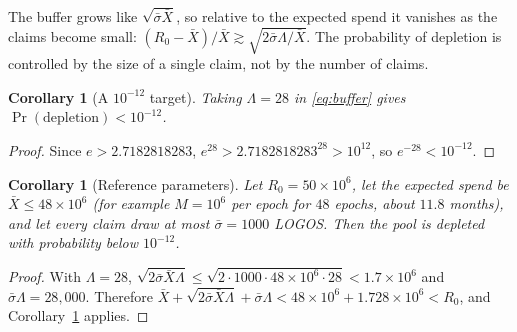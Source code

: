 \documentclass[11pt,a4paper]{article}
\newtheorem{corollary}[theorem]{Corollary}
\begin{document}
The buffer grows like $\sqrt{\bar\sigma\bar X}$, so relative to the expected spend it vanishes as the claims become small: $(R_0-\bar X)/\bar X\gtrsim\sqrt{2\bar\sigma\Lambda/\bar X}$. The probability of depletion is controlled by the size of a single claim, not by the number of claims.

\begin{corollary}[A $10^{-12}$ target]\label{cor:1e-12}
Taking $\Lambda=28$ in \eqref{eq:buffer} gives $\Pr(\text{depletion})<10^{-12}$.
\end{corollary}
\begin{proof}
Since $e>2.7182818283$, $e^{28}>2.7182818283^{28}>10^{12}$, so $e^{-28}<10^{-12}$.
\end{proof}

\begin{corollary}[Reference parameters]\label{cor:reference}
Let $R_0=50\times10^6$, let the expected spend be $\bar X\le48\times10^6$ (for example $M=10^6$ per epoch for $48$ epochs, about $11.8$ months), and let every claim draw at most $\bar\sigma=1000$ LOGOS. Then the pool is depleted with probability below $10^{-12}$.
\end{corollary}
\begin{proof}
With $\Lambda=28$, $\sqrt{2\bar\sigma\bar X\Lambda}\le\sqrt{2\cdot1000\cdot48\times10^6\cdot28}<1.7\times10^6$ and $\bar\sigma\Lambda=28{,}000$. Therefore $\bar X+\sqrt{2\bar\sigma\bar X\Lambda}+\bar\sigma\Lambda<48\times10^6+1.728\times10^6<R_0$, and Corollary~\ref{cor:1e-12} applies.
\end{proof}
\end{document}
